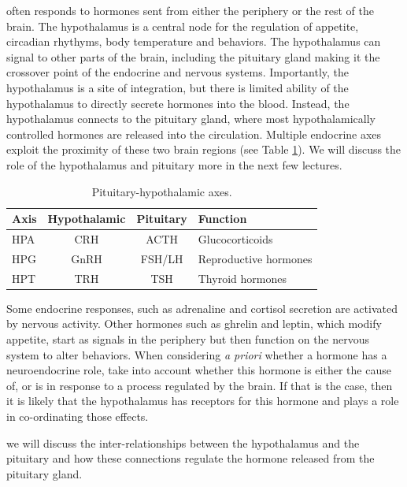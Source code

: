 \documentclass{tufte-handout}
\begin{document}
 often responds to hormones sent from either the periphery or the rest of the brain.  The hypothalamus is a central node for the regulation of appetite, circadian rhythyms, body temperature and behaviors.  The hypothalamus can signal to other parts of the brain, including the pituitary gland making it the crossover point of the endocrine and nervous systems.  Importantly, the hypothalamus is a site of integration, but there is limited ability of the hypothalamus to directly secrete hormones into the blood.  Instead, the hypothalamus connects to the pituitary gland, where most hypothalamically controlled hormones are released into the circulation.  Multiple endocrine axes exploit the proximity of these two brain regions (see Table \ref{tab:pituitary-axes}).  We will discuss the role of the hypothalamus and pituitary more in the next few lectures.  

\begin{table}
  \centering
  \begin{tabular}{lccl}
    \toprule
    Axis & Hypothalamic & Pituitary & Function \\
    \midrule
    HPA & CRH & ACTH & Glucocorticoids \\
    HPG & GnRH & FSH/LH & Reproductive hormones \\
    HPT & TRH & TSH & Thyroid hormones \\
    \bottomrule
  \end{tabular}
  \caption{Pituitary-hypothalamic axes.}
  \label{tab:pituitary-axes}
\end{table}

  Some endocrine responses, such as adrenaline and cortisol secretion are activated by nervous activity.  Other hormones such as ghrelin and leptin, which modify appetite, start as signals in the periphery but then function on the nervous system to alter behaviors.  When considering \textit{a priori} whether a hormone has a neuroendocrine role, take into account whether this hormone is either the cause of, or is in response to a process regulated by the brain.  If that is the case, then it is likely that the hypothalamus has receptors for this hormone and plays a role in co-ordinating those effects.

 we will discuss the inter-relationships between the hypothalamus and the pituitary and how these connections regulate the hormone released from the pituitary gland.

\listoffigures
\listoftables



\end{document}
